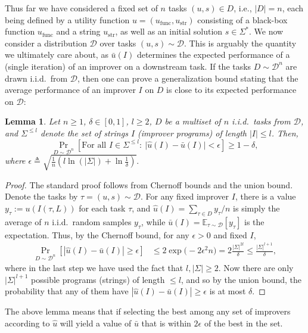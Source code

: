 \documentclass{article} %
\newtheorem{lemma}{Lemma}
\def\eps{{\epsilon}}
\newcommand{\E}{\mathbb{E}}
\newcommand{\metautil}{{\hat{u}}}
\newcommand{\exputil}{{\bar{u}}}
\newcommand{\sol}{{s}}
\newcommand{\D}{{\mathcal{D}}}
\newcommand{\defeq}{\triangleq}
\begin{document}
Thus far we have considered a fixed set of $n$ tasks $(u, \sol) \in D$, i.e., $|D|=n$, each being defined by a utility function $u=(u_\text{func}, u_\text{str})$ consisting of a black-box function $u_\text{func}$ and a string $u_\text{str}$, as well as an initial solution $\sol \in \Sigma^*$. We now consider a distribution $\D$ over tasks $(u, \sol) \sim \D$. 
This is arguably the quantity we ultimately care about, as $\exputil(I)$ determines the expected performance of a (single iteration) of an improver on a downstream task. 
If the tasks $D\sim \D^n$ are drawn i.i.d.\ from $\D$, then one can prove a generalization bound stating that the average performance of an improver $I$ on $D$ is close to its expected performance on $\D$:
\begin{lemma}
    Let $n \ge 1$, $\delta \in [0,1]$, $l \ge 2$, $D$ be a multiset of $n$ i.i.d.\ tasks from $\D$, and $\Sigma^{\le l}$ denote the set of strings $I$ (improver programs) of length $|I| \le l$. Then, 
    $$\Pr_{D\sim \D^n}\left[\text{For all } I \in \Sigma^{\le l}:~\bigl|\metautil(I) - \exputil(I)\bigr| < \epsilon\right] \ge 1-\delta,$$
    where $\eps \defeq \sqrt{\frac{1}{n}\left(l \ln(|\Sigma|) + \ln \frac{1}{\delta}\right)}.$
\end{lemma}
\begin{proof}
The standard proof follows from Chernoff bounds and the union bound. Denote the tasks by $\tau=(u, \sol)\sim \D$.  For any fixed improver $I$, there is a value $y_\tau:= u(I(\tau, L))$ for each task $\tau$, and $\metautil(I)=\sum_{\tau \in D}y_\tau/n$ is simply the average of $n$ i.i.d.\ random samples $y_\tau$, while $\exputil(I)=\E_{\tau \sim \D}[y_\tau]$ is the expectation. 
Thus, by the Chernoff bound, 
for any $\epsilon > 0$ and fixed $I$,
\begin{align*}
\Pr_{D\sim \D^n}\left[\left|\metautil(I) - \exputil(I)\right| \ge \epsilon\right] &\le 2\exp\bigl(-2\epsilon^2 n\bigr)
=2\frac{|\Sigma|^{2l}}{\delta}
\le \frac{|\Sigma|^{l+1}}{\delta},
\end{align*}
where in the last step we have used the fact that $l, |\Sigma| \ge 2$. Now there are only $|\Sigma|^{l+1}$ possible programs (strings) of length $\le l$, and so by the union bound, the probability that any of them have $|\metautil(I) - \exputil(I)| \ge \epsilon$ is at most $\delta$.
\end{proof}
The above lemma means that if selecting the best among any set of improvers according to $\metautil$ will yield a value of $\exputil$ that is within $2\eps$ of the best in the set.
\end{document}
